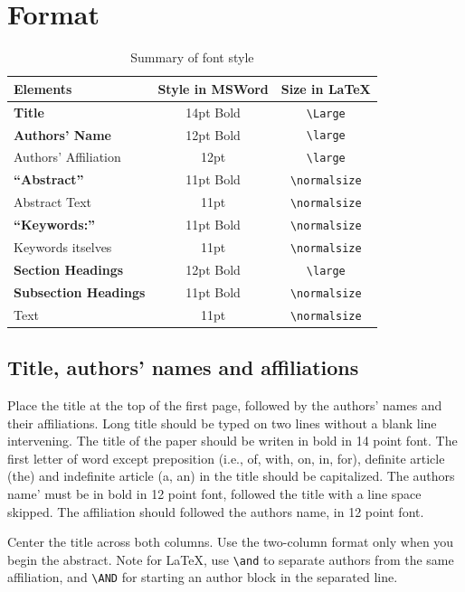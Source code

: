 \documentclass[11pt,a4paper]{article}
\begin{document}
\section{Format}

\begin{table}[ht]
\caption{Summary of font style}
\label{fontstyle}
\centering
\begin{tabular}{lcc} \hline\hline
Elements & Style in MSWord & Size in \LaTeX \\ \hline
\bf Title & 14pt Bold & \verb+\Large+ \\
\bf Authors' Name & 12pt Bold & \verb+\large+ \\
Authors' Affiliation & 12pt & \verb+\large+ \\
\bf ``Abstract'' & 11pt Bold & \verb+\normalsize+ \\
Abstract Text & 11pt & \verb+\normalsize+ \\
\bf ``Keywords:'' & 11pt Bold & \verb+\normalsize+ \\
Keywords itselves & 11pt & \verb+\normalsize+ \\
\bf Section Headings & 12pt Bold & \verb+\large+ \\
\bf Subsection Headings & 11pt Bold & \verb+\normalsize+ \\
Text & 11pt & \verb+\normalsize+ \\
\hline\hline
\end{tabular}
\end{table}

\subsection{Title, authors' names and affiliations}

Place the title at the top of the first page, followed by the authors'
names and their affiliations.  Long title should be typed on two lines
without a blank line intervening.  The title of the paper should be
writen in bold in 14 point font.  The first letter of word except
preposition (i.e., of, with, on, in, for), definite article (the) and
indefinite article (a, an) in the title should be capitalized.  The
authors name' must be in bold in 12 point font, followed the title with
a line space skipped.  The affiliation should followed the authors name,
in 12 point font.

Center the title across both columns.  Use the two-column format only
when you begin the abstract.  Note for \LaTeX{}, use \verb+\and+ to
separate authors from the same affiliation, and \verb+\AND+ for starting
an author block in the separated line.
\end{document}
